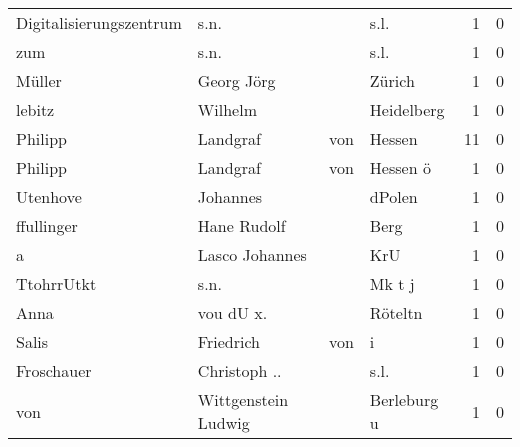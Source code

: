 \begin{tabular}{llllrr}
  Digitalisierungszentrum &                               s.n. &             &                                        s.l. &          1 &         0 \\
                      zum &                               s.n. &             &                                        s.l. &          1 &         0 \\
                   Müller &                         Georg Jörg &             &                                      Zürich &          1 &         0 \\
                   lebitz &                            Wilhelm &             &                                  Heidelberg &          1 &         0 \\
                  Philipp &                           Landgraf &         von &                                      Hessen &         11 &         0 \\
                  Philipp &                           Landgraf &         von &                                    Hessen ö &          1 &         0 \\
                 Utenhove &                           Johannes &             &                                      dPolen &          1 &         0 \\
               ffullinger &                        Hane Rudolf &             &                                        Berg &          1 &         0 \\
                        a &                     Lasco Johannes &             &                                         KrU &          1 &         0 \\
               TtohrrUtkt &                               s.n. &             &                                      Mk t j &          1 &         0 \\
                     Anna &                          vou dU x. &             &                                     Röteltn &          1 &         0 \\
                    Salis &                          Friedrich &         von &                                           i &          1 &         0 \\
               Froschauer &                       Christoph .. &             &                                        s.l. &          1 &         0 \\
                      von &                Wittgenstein Ludwig &             &                                 Berleburg u &          1 &         0 \\

\end{tabular}
